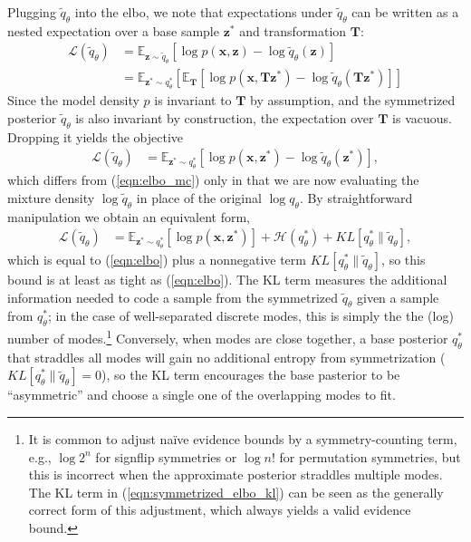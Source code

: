 \documentclass{article}
\newcommand{\E}{\mathbb{E}}
\renewcommand{\v}[1]{\mathbf{#1}}
\newcommand{\elbo}{{\sc elbo}}
\begin{document}
Plugging $\tilde{q}_\theta$ into the \elbo, we note that
expectations under $\tilde{q}_\theta$ can be written as a nested expectation
over a base sample $\v{z}^*$ and transformation $\v{T}$:
\begin{align*}
\mathcal{L}(\tilde{q}_\theta) &= \E_{\v{z}\sim \tilde{q}_\theta}\left[\log p(\v{x}, \v{z}) - \log \tilde{q}_\theta(\v{z})\right]\\
&= \E_{\v{z}^*\sim q^*_\theta}\left[\E_\v{T}\left[\log p(\v{x}, \v{T}\v{z}^*) -
  \log \tilde{q}_\theta(\v{T}\v{z}^*)\right]\right]
\end{align*}
Since the model density $p$ is invariant to $\v{T}$ by assumption, and
the symmetrized posterior $\tilde{q}_\theta$ is also
invariant by construction, the expectation over $\v{T}$ is vacuous. Dropping it yields the
objective
\begin{align}
\mathcal{L}(\tilde{q}_\theta) &= \E_{\v{z}^*\sim q^*_\theta}\left[\log p(\v{x}, \v{z}^*) -
  \log \tilde{q}_\theta(\v{z}^*)\right],\label{eqn:symmetrized_elbo}
\end{align}
which differs from (\ref{eqn:elbo_mc}) only in that we are now
evaluating the mixture density $\log \tilde{q}_\theta$ in place of the
original $\log q_\theta$. By straightforward manipulation we obtain
an equivalent form,
\begin{align}
\mathcal{L}(\tilde{q}_\theta) &= \E_{\v{z}^*\sim q^*_\theta}\left[\log
                                p(\v{x}, \v{z}^*)\right] + \mathcal{H}(q^*_\theta)
                                + KL[q^*_\theta \| \tilde{q}_\theta ],\label{eqn:symmetrized_elbo_kl}
\end{align}
which is equal to (\ref{eqn:elbo}) plus a nonnegative term
$KL[q^*_\theta \| \tilde{q}_\theta ]$, so this bound is at least as
tight as (\ref{eqn:elbo}). The KL term measures the additional
information needed to code a sample from the symmetrized
$\tilde{q}_\theta$ given a sample from $q^*_\theta$; in
the case of well-separated discrete modes, this is simply the
the (log) number of modes.\footnote{It is common to adjust na\"ive
  evidence bounds by a symmetry-counting term, e.g.,
  $\log 2^n$ for signflip symmetries or $\log n!$ for permutation
  symmetries, but this is incorrect when the approximate posterior
  straddles multiple modes. The KL term in
  (\ref{eqn:symmetrized_elbo_kl}) can be seen as the generally correct
  form of this adjustment, which always yields a valid evidence
  bound.} Conversely, when modes are close together, a base posterior
$q^*_\theta$ that straddles all modes will gain no
additional entropy from symmetrization ($KL[q^*_\theta \|
\tilde{q}_\theta ]=0$), so the KL term encourages the base pasterior
to be ``asymmetric'' and choose a single one of the overlapping modes
to fit.
\end{document}
